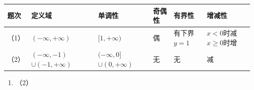 {\def\LTcaptype{none}\footnotesize\setlength{\tabcolsep}{3pt}%
\begin{longtable}[]{@{}
  >{\raggedright\arraybackslash}p{}
  >{\raggedright\arraybackslash}p{}
  >{\raggedright\arraybackslash}p{}
  >{\raggedright\arraybackslash}p{}
  >{\raggedright\arraybackslash}p{}
  >{\raggedright\arraybackslash}p{}@{}}
\toprule\noalign{}
\begin{minipage}[b]{\linewidth}\raggedright
题次
\end{minipage} & \begin{minipage}[b]{\linewidth}\raggedright
定义域
\end{minipage} & \begin{minipage}[b]{\linewidth}\raggedright
单调性
\end{minipage} & \begin{minipage}[b]{\linewidth}\raggedright
奇偶性
\end{minipage} & \begin{minipage}[b]{\linewidth}\raggedright
有界性
\end{minipage} & \begin{minipage}[b]{\linewidth}\raggedright
增减性
\end{minipage} \\
\midrule\noalign{}
\endhead
\bottomrule\noalign{}
\endlastfoot
（1） & \((-\infty, +\infty)\) & \([1, +\infty)\) & 偶 & 有下界\(y=1\) &
\(x<0\)时减 \(x\geqslant0\)时增 \\
（2） & \((-\infty, -1)\) \(\cup (-1, +\infty)\) &
\((-\infty, 0]\) \(\cup (0, +\infty)\) & 无 & 无 & 减 \\
\end{longtable}
}

\begin{enumerate}[start=6]
\item
  （2）
\end{enumerate}

